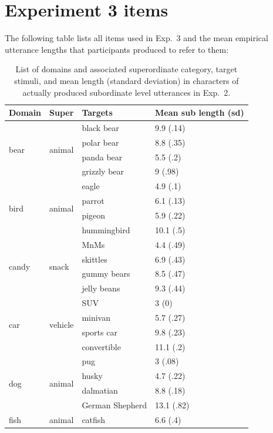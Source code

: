 \documentclass[11pt]{article}
\begin{document}
\section{Experiment 3 items}
\label{app:taxonomicstimuli}


The following table lists all items used in Exp.~3 and the mean empirical utterance lengths that participants produced to refer to them:

\begin{table}
\centering
\caption{List of domains and associated superordinate category, target stimuli, and mean length (standard deviation) in characters of actually produced subordinate level utterances in Exp.~2.}
	\label{tab:reflevelstimuli}
	\begin{tabular}{l l l l}
	\toprule
	Domain & Super & Targets & Mean sub length (sd)\\
	\midrule
	\multirow{4}{*}{bear} & \multirow{4}{*}{animal} & black bear & 9.9 (.14)\\
	& & polar bear & 8.8 (.35)\\
	& & panda bear & 5.5 (.2)\\
	& & grizzly bear & 9 (.98)\\
	\midrule
	\multirow{4}{*}{bird} & \multirow{4}{*}{animal} & eagle & 4.9 (.1)\\
	& 	& parrot & 6.1 (.13)\\
	& & pigeon & 5.9 (.22)\\
	& 	& hummingbird & 10.1 (.5)\\
	\midrule
	\multirow{4}{*}{candy} & \multirow{4}{*}{snack} & MnMs & 4.4 (.49)\\
		& & skittles & 6.9 (.43)\\
		& & gummy bears & 8.5 (.47)\\
		& & jelly beans & 9.3 (.44)\\
	\midrule
	\multirow{4}{*}{car} & \multirow{4}{*}{vehicle} & SUV & 3 (0)\\
		& & minivan & 5.7 (.27)\\
		& & sports car & 9.8 (.23)\\
		& & convertible & 11.1 (.2)\\
	\midrule
	\multirow{4}{*}{dog} & \multirow{4}{*}{animal} & pug & 3 (.08)\\
		& & husky & 4.7 (.22)\\
		& & dalmatian & 8.8 (.18)\\
		& & German Shepherd & 13.1 (.82)\\
	\midrule
	\multirow{4}{*}{fish} & \multirow{4}{*}{animal} & catfish & 6.6 (.4)\\

\end{tabular}
\end{table}
\end{document}
